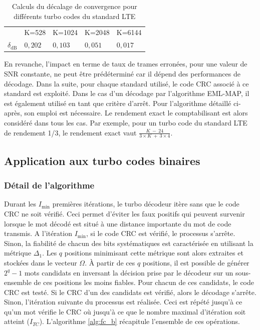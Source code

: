 \begin{table}[!b]
    \centering
    \caption{Calculs du décalage de convergence pour différents turbo codes du standard LTE}
    \label{tab:crcShift}
        \begin{tabular}{rllll}
            \toprule
            		& K=528 & K=1024 & K=2048 & K=6144 \\
            \cmidrule(l){2-2}\cmidrule(l){3-3}\cmidrule(l){4-4}\cmidrule(l){5-5}
            $\delta_\text{dB}$ & $0,202$ & $0,103$ & $0,051$ & $0,017$ \\
            \bottomrule
        \end{tabular}%
\end{table}

En revanche, l'impact en terme de taux de trames erronées, pour une valeur de SNR constante, ne peut être prédéterminé car il 
dépend des performances de décodage.
Dans la suite, pour chaque standard utilisé, le code CRC associé à ce standard est exploité. Dans le cas d'un décodage par l'algorithme 
EML-MAP, il est également utilisé en tant que critère d'arrêt. Pour l'algorithme détaillé ci-après, son emploi est nécessaire. Le rendement exact
le comptabilisant est alors considéré dans tous les cas. Par exemple, pour un turbo code du standard LTE
de rendement 1/3, le rendement exact vaut  $\frac{K~-~24}{3\times K~+~3\times 4}$.

\subsection{Application aux turbo codes binaires}

\subsubsection{Détail de l'algorithme}
Durant les $I_{\text{min}}$ premières itérations, le turbo décodeur itère sans que le code
CRC ne soit vérifié. Ceci permet d'éviter les faux positifs qui peuvent survenir lorsque le mot décodé est situé à une 
distance importante du mot de code transmis. A l'itération $I_{\text{min}}$, si le code CRC est vérifié, le processus
s'arrête. Sinon, la fiabilité de chacun des bits systématiques est caractérisée en utilisant la métrique $\Delta_1$.
Les $q$ positions minimisant cette métrique sont alors extraites et stockées dans le vecteur $\Omega$. À partir de ces $q$ positions,
il est possible de générer $2^q-1$ mots candidats en inversant la décision prise par le décodeur sur un sous-ensemble de 
ces positions les moins fiables. Pour chacun de ces 
candidats, le code CRC est testé. Si le CRC d'un des candidats est vérifié, alors le décodage s'arrête. Sinon, 
l'itération suivante du processus est réalisée. Ceci est répété jusqu'à ce qu'un mot vérifie le 
CRC où jusqu'à ce que le nombre maximal d'itération soit atteint ($I_{TC}$). L'algorithme \ref{alg:fc_b} récapitule l'ensemble de 
ces opérations.

